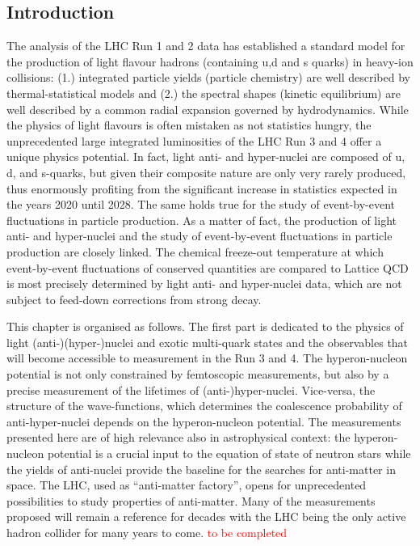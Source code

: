 \subsection{Introduction}

The analysis of the LHC Run 1 and 2 data has established a standard model for the production of light flavour hadrons (containing u,d and s quarks) in heavy-ion collisions: (1.) integrated particle yields (particle chemistry) are well described by thermal-statistical models and (2.) the spectral shapes (kinetic equilibrium) are well described by a common radial expansion governed by hydrodynamics.
While the physics of light flavours is often mistaken as not statistics hungry, the unprecedented large integrated luminosities of the LHC Run 3 and 4 offer a unique physics potential. In fact, light anti- and hyper-nuclei are composed of u, d, and s-quarks, but given their composite nature are only very rarely produced, thus enormously profiting from the significant increase in statistics expected in the years 2020 until 2028. The same holds true for the study of event-by-event fluctuations in particle production.
As a matter of fact, the production of light anti- and hyper-nuclei and the study of event-by-event fluctuations in particle production are closely linked. The chemical freeze-out temperature at which event-by-event fluctuations of conserved quantities are compared to Lattice QCD is most precisely determined by light anti- and hyper-nuclei data, which are not subject to feed-down corrections from strong decay.

This chapter is organised as follows. 
The first part is dedicated to the physics of light (anti-)(hyper-)nuclei and exotic multi-quark states and the observables that will become accessible to measurement in the Run 3 and 4. The hyperon-nucleon potential is not only constrained by femtoscopic measurements, but also by a precise measurement of the lifetimes of (anti-)hyper-nuclei.
Vice-versa, the structure of the wave-functions, which determines the coalescence probability of anti-hyper-nuclei depends on the hyperon-nucleon potential.
The measurements presented here are of high relevance also in astrophysical context: the hyperon-nucleon potential is a crucial input to the equation of state of neutron stars while the yields of anti-nuclei provide the baseline for the searches for anti-matter in space. 
The LHC, used as ``anti-matter factory'', opens for unprecedented possibilities to study properties of anti-matter. Many of the measurements proposed will remain a reference for decades with the LHC being the only active hadron collider for many years to come.
\textcolor{red}{to be completed}
